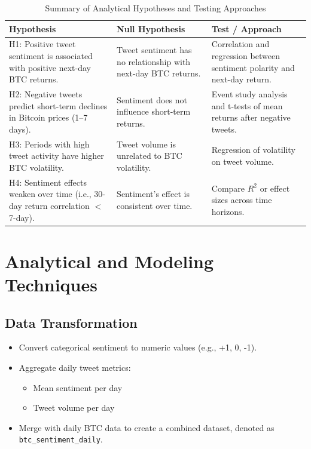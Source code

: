 \documentclass[12pt]{article}
\begin{document}
\begin{table}[h!]
\centering
\renewcommand{\arraystretch}{1.3}
\begin{tabular}{|p{4cm}|p{5cm}|p{5cm}|}
\hline
\textbf{Hypothesis} & \textbf{Null Hypothesis} & \textbf{Test / Approach} \\ \hline
H1: Positive tweet sentiment is associated with positive next-day BTC returns. & 
Tweet sentiment has no relationship with next-day BTC returns. & 
Correlation and regression between sentiment polarity and next-day return. \\ \hline

H2: Negative tweets predict short-term declines in Bitcoin prices (1--7 days). & 
Sentiment does not influence short-term returns. & 
Event study analysis and t-tests of mean returns after negative tweets. \\ \hline

H3: Periods with high tweet activity have higher BTC volatility. & 
Tweet volume is unrelated to BTC volatility. & 
Regression of volatility on tweet volume. \\ \hline

H4: Sentiment effects weaken over time (i.e., 30-day return correlation $<$ 7-day). & 
Sentiment’s effect is consistent over time. & 
Compare $R^2$ or effect sizes across time horizons. \\ \hline
\end{tabular}
\caption{Summary of Analytical Hypotheses and Testing Approaches}
\end{table}

\section{Analytical and Modeling Techniques}

\subsection{Data Transformation}

\begin{itemize}
    \item Convert categorical sentiment to numeric values (e.g., +1, 0, -1).
    \item Aggregate daily tweet metrics:
    \begin{itemize}
        \item Mean sentiment per day
        \item Tweet volume per day
    \end{itemize}
    \item Merge with daily BTC data to create a combined dataset, denoted as \texttt{btc\_sentiment\_daily}.
\end{itemize}
\end{document}
